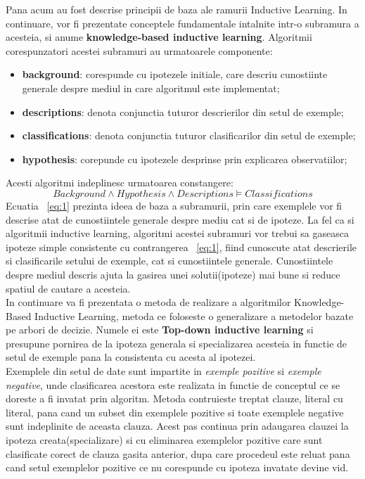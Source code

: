 \documentclass[a4paper,12pt]{report}
\begin{document}
	Pana acum au fost descrise principii de baza ale ramurii Inductive Learning. In continuare, vor fi prezentate conceptele fundamentale intalnite intr-o subramura a acesteia, si anume \textbf{knowledge-based inductive learning}.  Algoritmii corespunzatori acestei subramuri au urmatoarele componente:
\begin{itemize}
\item \textbf{background}: corespunde cu ipotezele initiale, care descriu cunostiinte generale despre mediul in care algoritmul este implementat;
\item \textbf{descriptions}: denota conjunctia tuturor descrierilor din setul de exemple;
\item \textbf{classifications}: denota conjunctia tuturor clasificarilor din setul de exemple;
\item \textbf{hypothesis}: corepunde cu ipotezele desprinse prin explicarea observatiilor; 
\end{itemize}
Acesti algoritmi indeplinesc urmatoarea constangere:
\begin{equation} \label{eq:1}
Background \wedge Hypothesis \wedge Descriptions \models Classifications
\end{equation}
	Ecuatia ~\ref{eq:1} prezinta ideea de baza a subramurii, prin care exemplele vor fi descrise atat de cunostiintele generale despre mediu cat si de ipoteze. La fel ca si algoritmii inductive learning, algoritmi acestei subramuri vor trebui sa gaseasca ipoteze simple consistente cu contrangerea ~\ref{eq:1}, fiind cunoscute atat descrierile si clasificarile setului de exemple, cat si cunostiintele generale. Cunostiintele despre mediul descris ajuta la gasirea unei solutii(ipoteze) mai bune si reduce spatiul de cautare a acesteia.\\
	In continuare va fi prezentata o metoda de realizare a algoritmilor Knowledge-Based Inductive Learning, metoda ce foloseste o generalizare a metodelor bazate pe arbori de decizie. Numele ei  este \textbf{Top-down inductive learning} si presupune pornirea de la ipoteza generala si specializarea acesteia in functie de setul de exemple pana la consistenta cu acesta al ipotezei. \\
	Exemplele din setul de date sunt impartite in \textit{exemple pozitive} si \textit{exemple negative}, unde clasificarea acestora este realizata in functie de conceptul ce se doreste a fi invatat prin algoritm. Metoda contruieste treptat clauze, literal cu literal, pana cand un subset din exemplele pozitive si toate exemplele negative sunt indeplinite de aceasta clauza. Acest pas continua prin adaugarea clauzei la ipoteza creata(specializare) si cu eliminarea exemplelor pozitive care sunt clasificate corect de clauza gasita anterior, dupa care procedeul este reluat pana cand setul exemplelor pozitive ce nu corespunde cu ipoteza invatate devine vid.\\
\end{document}
